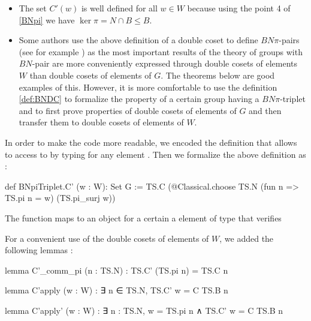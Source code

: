 \begin{remark}
    \begin{itemize}
        \item The set $C'\left( w \right)$ is well defined for all $w \in W$ because using the point 4 of \ref{BNpi} we have $\ker \pi = N \cap B \le B$.
        \item Some authors use the above definition of a double coset to define $BN\pi$-pairs (see for example \cite{bourbaki_groupes_2007}) as the most important results of the theory of groups with $BN$-pair are more conveniently expressed through double cosets of elements $W$ than double cosets of elements of $G$. The theorems \todo{} below are good examples of this. 
However, it is more comfortable to use the definition \ref{def:BNDC} to formalize the property of a certain group having a $BN\pi$-triplet and to first prove properties of double cosets of elements of $G$ and then transfer them to double cosets of elements of $W$.
\end{itemize}
\end{remark}

In order to make the \Lean code more readable, we encoded the definition  that allows to access to  by typing  for any element . Then we formalize the above definition as :
\begin{leancode}
def BNpiTriplet.C' (w : W): Set G := 
  TS.C (@Classical.choose TS.N (fun n => TS.pi n = w) (TS.pi_surj w))
\end{leancode} 

\begin{commentary} 
The function  maps to an object  for a certain  a element of type  that verifies 
\end{commentary}

For a convenient use of the double cosets of elements of $W$, we added the following lemmas :

\begin{leancode}
lemma C'_comm_pi (n : TS.N) : TS.C' (TS.pi n) = TS.C n 

lemma C'apply (w : W) : ∃ n ∈ TS.N, TS.C' w = C TS.B n 

lemma C'apply' (w : W) : ∃ n : TS.N, w = TS.pi n ∧ TS.C' w = C TS.B n
\end{leancode}

